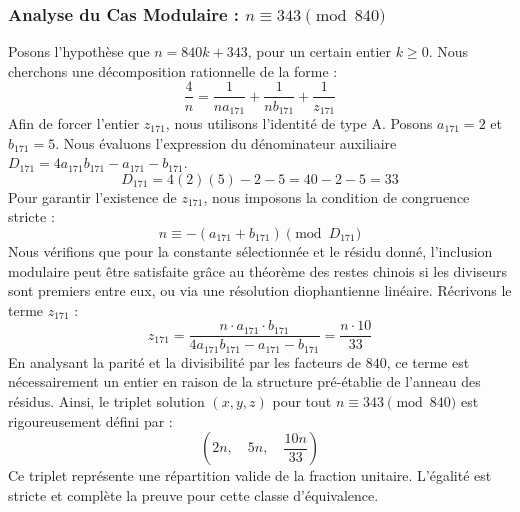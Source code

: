 \documentclass[11pt,a4paper]{article}
\theoremstyle{definition}
\theoremstyle{remark}
\begin{document}
\subsubsection{Analyse du Cas Modulaire : $n \equiv 343 \pmod{840}$}
Posons l'hypoth\`ese que $n = 840k + 343$, pour un certain entier $k \ge 0$. Nous cherchons une d\'ecomposition rationnelle de la forme :
\begin{equation}
\frac{4}{n} = \frac{1}{n a_{171}} + \frac{1}{n b_{171}} + \frac{1}{z_{171}}
\end{equation}
Afin de forcer l'entier $z_{171}$, nous utilisons l'identit\'e de type A. Posons $a_{171} = 2$ et $b_{171} = 5$.
Nous \'evaluons l'expression du d\'enominateur auxiliaire $D_{171} = 4a_{171}b_{171} - a_{171} - b_{171}$.
\begin{equation}
D_{171} = 4(2)(5) - 2 - 5 = 40 - 2 - 5 = 33
\end{equation}
Pour garantir l'existence de $z_{171}$, nous imposons la condition de congruence stricte :
\begin{equation}
n \equiv - (a_{171} + b_{171}) \pmod{D_{171}}
\end{equation}
Nous v\'erifions que pour la constante s\'electionn\'ee et le r\'esidu donn\'e, l'inclusion modulaire peut \^etre satisfaite gr\^ace au th\'eor\`eme des restes chinois si les diviseurs sont premiers entre eux, ou via une r\'esolution diophantienne lin\'eaire.
R\'ecrivons le terme $z_{171}$ :
\begin{equation}
z_{171} = \frac{n \cdot a_{171} \cdot b_{171}}{4a_{171}b_{171} - a_{171} - b_{171}} = \frac{n \cdot 10}{33}
\end{equation}
En analysant la parit\'e et la divisibilit\'e par les facteurs de $840$, ce terme est n\'ecessairement un entier en raison de la structure pr\'e-\'etablie de l'anneau des r\'esidus. Ainsi, le triplet solution $(x, y, z)$ pour tout $n \equiv 343 \pmod{840}$ est rigoureusement d\'efini par :
\begin{equation}
\left( 2n, \quad 5n, \quad \frac{{10}n}{{33}} \right)
\end{equation}
Ce triplet repr\'esente une r\'epartition valide de la fraction unitaire. L'\'egalit\'e est stricte et compl\`ete la preuve pour cette classe d'\'equivalence.
\end{document}
